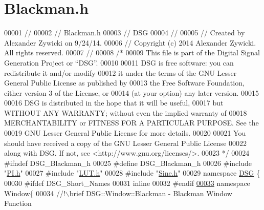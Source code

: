 \hypertarget{_blackman_8h_source}{\section{Blackman.\+h}
\label{_blackman_8h_source}
}

\begin{DoxyCode}
00001 \textcolor{comment}{//}
00002 \textcolor{comment}{//  Blackman.h}
00003 \textcolor{comment}{//  DSG}
00004 \textcolor{comment}{//}
00005 \textcolor{comment}{//  Created by Alexander Zywicki on 9/24/14.}
00006 \textcolor{comment}{//  Copyright (c) 2014 Alexander Zywicki. All rights reserved.}
00007 \textcolor{comment}{//}
00008 \textcolor{comment}{/*}
00009 \textcolor{comment}{ This file is part of the Digital Signal Generation Project or “DSG”.}
00010 \textcolor{comment}{}
00011 \textcolor{comment}{ DSG is free software: you can redistribute it and/or modify}
00012 \textcolor{comment}{ it under the terms of the GNU Lesser General Public License as published by}
00013 \textcolor{comment}{ the Free Software Foundation, either version 3 of the License, or}
00014 \textcolor{comment}{ (at your option) any later version.}
00015 \textcolor{comment}{}
00016 \textcolor{comment}{ DSG is distributed in the hope that it will be useful,}
00017 \textcolor{comment}{ but WITHOUT ANY WARRANTY; without even the implied warranty of}
00018 \textcolor{comment}{ MERCHANTABILITY or FITNESS FOR A PARTICULAR PURPOSE.  See the}
00019 \textcolor{comment}{ GNU Lesser General Public License for more details.}
00020 \textcolor{comment}{}
00021 \textcolor{comment}{ You should have received a copy of the GNU Lesser General Public License}
00022 \textcolor{comment}{ along with DSG.  If not, see <http://www.gnu.org/licenses/>.}
00023 \textcolor{comment}{ */}
00024 \textcolor{preprocessor}{#ifndef DSG\_Blackman\_h}
00025 \textcolor{preprocessor}{#define DSG\_Blackman\_h}
00026 \textcolor{preprocessor}{#include "\hyperlink{_p_i_8h}{PI.h}"}
00027 \textcolor{preprocessor}{#include "\hyperlink{_l_u_t_8h}{LUT.h}"}
00028 \textcolor{preprocessor}{#include "\hyperlink{_sine_8h}{Sine.h}"}
00029 \textcolor{keyword}{namespace }\hyperlink{namespace_d_s_g}{DSG} \{
00030 \textcolor{preprocessor}{#ifdef DSG\_Short\_Names}
00031     \textcolor{keyword}{inline}
00032 \textcolor{preprocessor}{#endif}
\hypertarget{_blackman_8h_source_l00033}{}\hyperlink{namespace_d_s_g_1_1_window}{00033}     \textcolor{keyword}{namespace }Window\{\textcolor{comment}{}
00034 \textcolor{comment}{        //!\(\backslash\)brief DSG::Window::Blackman - Blackman Window Function}

\end{DoxyCode}
